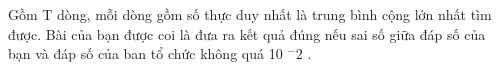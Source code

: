 Gồm T dòng, mỗi dòng gồm số thực duy nhất là trung bình cộng lớn nhất tìm được. Bài của bạn được coi là đưa ra kết quả đúng nếu sai số giữa đáp số của bạn và đáp số của ban tổ chức không quá 10   $^    -2   $   .
